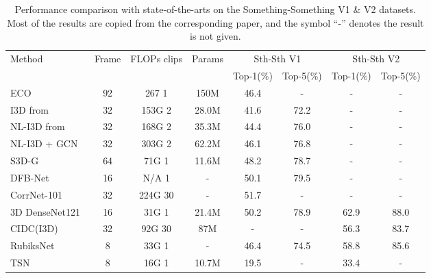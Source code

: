 \documentclass[journal]{IEEEtran}
\begin{document}
\begin{table*}
\caption{Performance comparison with state-of-the-arts on the Something-Something V1 \& V2 datasets. Most of the results are copied from the corresponding paper, and the symbol ``-” denotes the result is not given.}
\label{tab:sota}
\centering
\begin{tabular}{l|c|c|c|c|c|c|c}
\hline
Method                          & Frame & FLOPs  clips      & Params & \multicolumn{2}{c}{Sth-Sth V1} & \multicolumn{2}{c}{Sth-Sth V2} \\
                                      &       &                           &       & Top-1(\%)          & Top-5(\%)          & Top-1(\%)          & Top-5(\%)  \\ \hline
ECO~\cite{zolfaghari2018eco}       & 92    & 267  1            & 150M  & 46.4           & -              & -              & -              \\
I3D from~\cite{wang2018videos}            & 32    & 153G  2  & 28.0M & 41.6           & 72.2           & -              & -              \\
NL-I3D from~\cite{wang2018videos}         & 32    & 168G  2  & 35.3M & 44.4           & 76.0           & -        & -              \\
NL-I3D + GCN~\cite{wang2018videos}    & 32    & 303G  2  & 62.2M & 46.1           & 76.8           & -         & -              \\
S3D-G~\cite{xie2018rethinking}   & 64    & 71G  1   & 11.6M & 48.2           & 78.7           & -              & -              \\
DFB-Net~\cite{martinez2019action}   & 16    & N/A  1   & -     & 50.1           & 79.5           & -              & -              \\
CorrNet-101~\cite{wang2020video}   & 32    & 224G  30   & -     & 51.7           & -           & -              & -              \\
3D DenseNet121~\cite{zhou2020spatiotemporal}  & 16    & 31G  1   & 21.4M     & 50.2           & 78.9           & 62.9              & 88.0              \\
CIDC(I3D)~\cite{li2020directional}  & 32    & 92G  30   & 87M     & -           & -           & 56.3              & 83.7              \\
RubiksNet~\cite{fan2020rubiksnet}   & 8    & 33G  1   & -     & 46.4           & 74.5           & 58.8              & 85.6              \\
\hline
TSN~\cite{wang2016temporal}   & 8     & 16G  1            & 10.7M & 19.5           & -              & 33.4           & -              \\

\end{tabular}
\end{table*}
\end{document}
